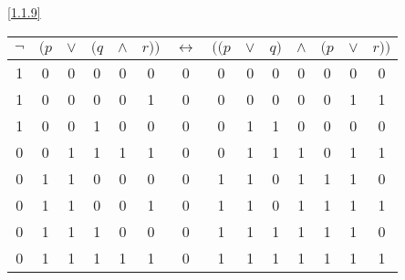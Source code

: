 \documentclass[boxes]{homework}
\begin{document}
\begin{solution}
    \ref{1.1.9}
    \begin{center}
        \begin{tabular}{cccccc|c|ccccccc}
            $\lnot$ & $(p$ & $\lor$ & $(q$ & $\land$ & $r))$ & $\leftrightarrow$ & $((p$ & $\lor$ & $q)$ & $\land$ & $(p$ & $\lor$ & $r))$ \\
            \hline
            1       & 0    & 0      & 0    & 0       & 0     & 0                 & 0     & 0      & 0    & 0       & 0    & 0      & 0     \\
            1       & 0    & 0      & 0    & 0       & 1     & 0                 & 0     & 0      & 0    & 0       & 0    & 1      & 1     \\
            1       & 0    & 0      & 1    & 0       & 0     & 0                 & 0     & 1      & 1    & 0       & 0    & 0      & 0     \\
            0       & 0    & 1      & 1    & 1       & 1     & 0                 & 0     & 1      & 1    & 1       & 0    & 1      & 1     \\
            0       & 1    & 1      & 0    & 0       & 0     & 0                 & 1     & 1      & 0    & 1       & 1    & 1      & 0     \\
            0       & 1    & 1      & 0    & 0       & 1     & 0                 & 1     & 1      & 0    & 1       & 1    & 1      & 1     \\
            0       & 1    & 1      & 1    & 0       & 0     & 0                 & 1     & 1      & 1    & 1       & 1    & 1      & 0     \\
            0       & 1    & 1      & 1    & 1       & 1     & 0                 & 1     & 1      & 1    & 1       & 1    & 1      & 1     \\
        \end{tabular}
    \end{center}
\end{solution}
\end{document}
